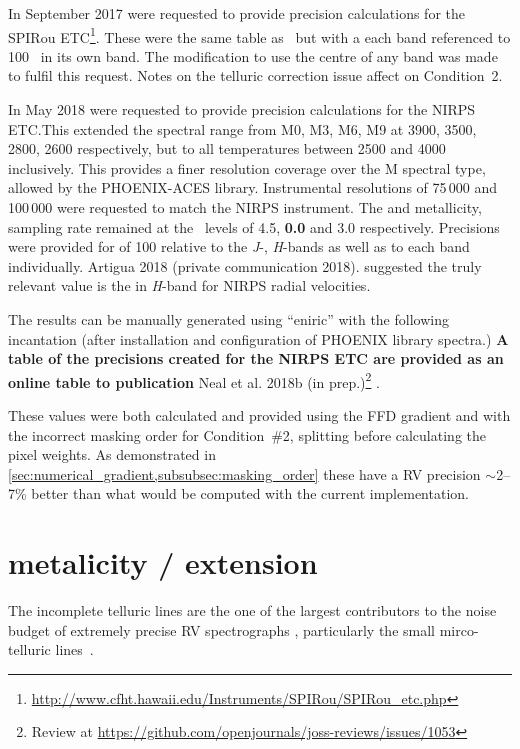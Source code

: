 In September 2017  were requested to provide precision calculations for the {SPIRou} ETC\footnote{\url{http://www.cfht.hawaii.edu/Instruments/SPIRou/SPIRou_etc.php}}.
These were the same table as~\citet{figueira_radial_2016} but with a each band referenced to 100~{\snr{}} in its own band.
The modification to use the centre of any band was made to fulfil this request.
Notes on the telluric correction issue affect on Condition~2.

In May 2018  were requested to provide precision calculations for the {NIRPS} {ETC}.\@ This extended the spectral range from {M0}, {M3}, {M6}, {M9} at 3900, 3500, 2800, 2600\K{} respectively, but to all temperatures between 2500 and 4000\K{} inclusively.
This provides a finer resolution coverage over the M spectral type, allowed by the {PHOENIX-ACES} library.
Instrumental resolutions of 75\,000 and 100\,000 were requested to match the {NIRPS} instrument.
The \Logg{} and metallicity, sampling rate remained at the~\citet{figueira_radial_2016} levels of 4.5, \textbf{0.0} and 3.0 respectively.\todo{}
Precisions were provided for \snr{} of 100 relative to the \emph{J}-, \emph{H}-bands as well as to each band individually.
Artigua 2018 (private communication 2018).  suggested the truly relevant value is the \snr{} in \emph{H}-band for {NIRPS} radial velocities.

The results can be manually generated using ``eniric'' with the following incantation (after installation and configuration of {PHOENIX} library spectra.)
\textbf{A table of the precisions created for the {NIRPS} ETC are provided as an online table to  publication} {Neal et al.
    2018b (in prep.)}\footnote{Review at \href{https://github.com/openjournals/joss-reviews/issues/1053}{https://github.com/openjournals/joss-reviews/issues/1053}} .


These values were both calculated and provided using the {FFD} gradient and with the incorrect masking order for Condition~\#2, splitting before calculating the pixel weights.
As  demonstrated in \cref{sec:numerical_gradient,subsubsec:masking_order} these have a {RV} precision \(\sim\)2--7\% better than what would be computed with the current implementation.


\section{ metalicity / \Logg{} extension}




The incomplete telluric lines are the one of the largest contributors to the noise budget of extremely precise {RV} spectrographs \citep{halverson_comprehensive_2016}, particularly the small mirco-telluric lines~\citep{cunha_impact_2014}.